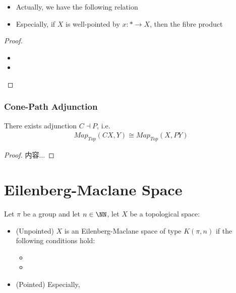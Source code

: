 \documentclass[Total.tex]{subfiles}
\begin{document}
				\begin{proposition}
					\begin{itemize}
						\item 
						Actually, we have the following relation
						\begin{center}
						\end{center}
						\item Especially, if $X$ is well-pointed by $x:*\rightarrow X$, then the fibre product
						{
							\begin{center}
						\end{center}}
					\end{itemize}
				\end{proposition}
				\begin{proof}
					\begin{itemize}
						\item 
						\item 
					\end{itemize}
				\end{proof}
				
				\subsubsection{Cone-Path Adjunction}
				
				\begin{theorem}
					There exists adjunction $C\dashv P$, i.e.
					\begin{gather*}
						Map_{Top}(CX,Y)\cong Map_{Top} (X,PY)
					\end{gather*}
				\end{theorem}
				\begin{proof}
					内容...
				\end{proof}
		\section{Eilenberg-Maclane Space}
			\begin{Def}
				Let $\pi$ be a group and let $n\in \NN$, let $X$ be a topological space:
				\begin{itemize}
					\item (Unpointed) $X$ is an Eilenberg-Maclane space of type $K(\pi,n)$ if the following conditions hold:
					\begin{itemize}
						\item 
						\item 
					\end{itemize}
					\item (Pointed) Especially, 
				\end{itemize}
			\end{Def}
\end{document}
